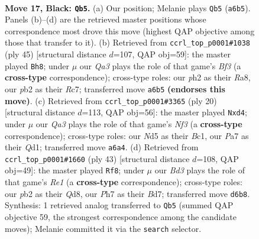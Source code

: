 \documentclass[11pt]{article}
\begin{document}
\clearpage

\begin{figure}[p]\centering
\begin{subfigure}{0.46\textwidth}\centering
\resizebox{\linewidth}{!}{%
\newchessgame
\chessboard[
  setfen={r6r/p2nkppp/q1pbp3/3n1PP1/Np1P3N/4P3/PP5P/R1BQ1RK1 b - - 0 17},
  showmover=false,
  pgfstyle=straightmove, color=movearrow, markmove={a6-b5}
]}
\caption{}
\end{subfigure}\hfill
\begin{subfigure}{0.46\textwidth}\centering
\resizebox{\linewidth}{!}{%
\newchessgame
\chessboard[
  setfen={r5k1/pprnpp1p/1n1p1bp1/q2P3P/3NPP2/1P2B1P1/6BK/1R1QR3 b - - 2 23},
  showmover=false,
  pgfstyle=straightmove, color=movearrow, markmove={f6-h8}
]}
\caption{}
\end{subfigure}
\\[4pt]
\begin{subfigure}{0.46\textwidth}\centering
\resizebox{\linewidth}{!}{%
\newchessgame
\chessboard[
  setfen={r1bqkbnr/pp6/2pp4/4pp2/2PnP2p/2NP1N1P/PP3PB1/R1BQK2R w KQkq - 0 11},
  showmover=false,
  pgfstyle=straightmove, color=movearrow, markmove={f3-d4}
]}
\caption{}
\end{subfigure}\hfill
\begin{subfigure}{0.46\textwidth}\centering
\resizebox{\linewidth}{!}{%
\newchessgame
\chessboard[
  setfen={1r1qr1k1/pp1b1pbp/2pp2p1/PP2n3/2PNP3/3P4/1BQ3PP/R2B1R1K b - - 8 22},
  showmover=false,
  pgfstyle=straightmove, color=movearrow, markmove={e8-f8}
]}
\caption{}
\end{subfigure}
\caption{\textbf{Move 17, Black: \texttt{Qb5}.} (a) Our position; Melanie plays \texttt{Qb5} (\texttt{a6b5}). Panels (b)--(d) are the retrieved master positions whose correspondence most drove this move (highest QAP objective among those that transfer to it). (b) Retrieved from \texttt{ccrl\_top\_p0001\#1038} (ply 45) [structural distance $d$=107, QAP obj=59]: the master played \texttt{Bh8}; under $\mu$ our \emph{Qa3} plays the role of that game's \emph{Bf3} (a \textbf{cross-type} correspondence); cross-type roles: our \emph{p}h2 as their \emph{R}a8, our \emph{p}b2 as their \emph{R}c7; transferred move \texttt{a6b5} \textbf{(endorses this move)}. (c) Retrieved from \texttt{ccrl\_top\_p0001\#3365} (ply 20) [structural distance $d$=113, QAP obj=56]: the master played \texttt{Nxd4}; under $\mu$ our \emph{Qa3} plays the role of that game's \emph{Nf3} (a \textbf{cross-type} correspondence); cross-type roles: our \emph{N}d5 as their \emph{B}c1, our \emph{P}a7 as their \emph{Q}d1; transferred move \texttt{a6a4}. (d) Retrieved from \texttt{ccrl\_top\_p0001\#1660} (ply 43) [structural distance $d$=108, QAP obj=49]: the master played \texttt{Rf8}; under $\mu$ our \emph{Bd3} plays the role of that game's \emph{Re1} (a \textbf{cross-type} correspondence); cross-type roles: our \emph{p}b2 as their \emph{Q}d8, our \emph{P}h7 as their \emph{B}d7; transferred move \texttt{d6b8}. Synthesis: 1 retrieved analog transferred to \texttt{Qb5} (summed QAP objective 59, the strongest correspondence among the candidate moves); Melanie committed it via the \texttt{search} selector.}
\label{fig:thought-m33}
\end{figure}
\end{document}
